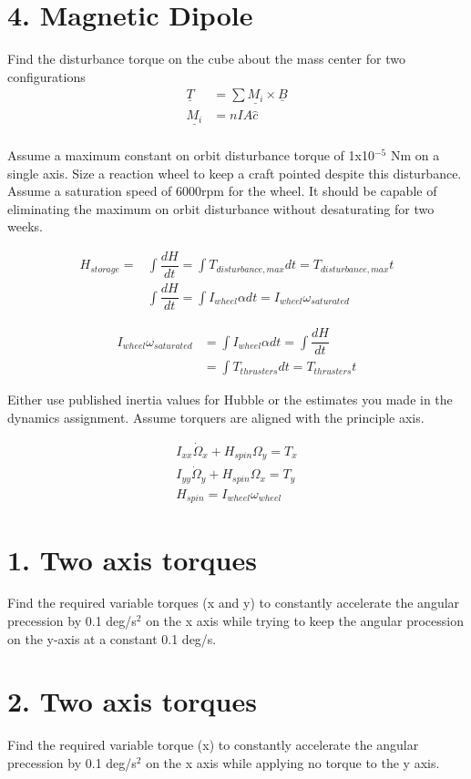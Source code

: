 \documentclass[onecolumn,10pt]{jhwhw}
\begin{document}
\part{4. Magnetic Dipole}
Find the disturbance torque on the cube about the mass center for two configurations
\begin{align*}
\underline{T} &= \sum \underline{M_i} \times \underline{B} \\
\underline{M_i} &= nIA\hat{c} \\
\end{align*}

Assume a maximum constant on orbit disturbance torque of 1x10$^{-5}$ Nm on a single axis. Size a reaction wheel to keep a craft pointed despite this disturbance. Assume a saturation speed of 6000rpm for the wheel. It should be capable of eliminating the maximum on orbit disturbance without desaturating for two weeks.

\begin{align*}
H_{{storage}} =& \int \dfrac{dH}{dt} = \int T_{{disturbance,max}} dt = T_{{disturbance,max}}t \\
& \int \dfrac{dH}{dt} = \int I_{{wheel}} \alpha dt = I_{{wheel}} \omega_{{saturated}}
\end{align*}

\begin{align*}
I_{{wheel}} \omega_{{saturated}} & = \int I_{{wheel}} \alpha dt = \int \dfrac{dH}{dt} \\
                                 & = \int T_{{thrusters}} dt = T_{{thrusters}} t
\end{align*}

Either use published inertia values for Hubble or the estimates you made in the dynamics assignment. Assume torquers are aligned with the principle axis.

\begin{align*}
I_{xx}\dot{\Omega}_{x} + H_{spin}\Omega_y = T_x \\
I_{yy}\dot{\Omega}_{y} + H_{spin}\Omega_x = T_y \\
H_{spin} = I_{wheel} \omega_{wheel}
\end{align*}

\part{1. Two axis torques}
Find the required variable torques (x and y) to constantly accelerate the angular precession by 0.1 deg/s$^2$ on the x axis while trying to keep the angular procession on the y-axis at a constant 0.1 deg/s.

\part{2. Two axis torques}
Find the required variable torque (x) to constantly accelerate the angular precession by 0.1 deg/s$^2$ on the x axis while applying no torque to the y axis.
\end{document}
